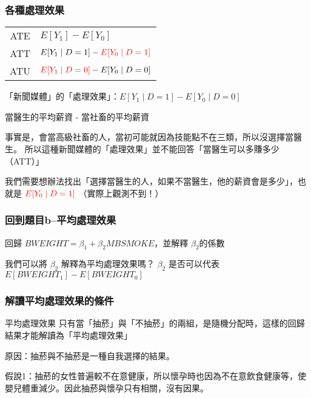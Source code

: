 \begin{frame}
    \frametitle{各種處理效果}
    \begin{table}
        \centering
        \begin{tabular}{c | l}
            \hline
            ATE & $E[Y_1] - E[Y_0]$ \\
            ATT & $E[Y_1 \mid D=1] - \begingroup \color{red} E[Y_0 \mid D=1]\endgroup$ \\
            ATU & $\begingroup \color{red}E[Y_1 \mid D=0] \endgroup -  E[Y_0 \mid D=0]$ \\
            \hline
        \end{tabular}
    \end{table}
    \vfill
    「新聞媒體」的「處理效果」：$E[Y_1 \mid D=1] - E[Y_0 \mid D=0]$
    
    當醫生的平均薪資 - 當社畜的平均薪資

    事實是，會當高級社畜的人，當初可能就因為技能點不在三類，所以沒選擇當醫生。
    所以這種新聞媒體的「處理效果」並不能回答「當醫生可以多賺多少（ATT）」
    
    我們需要想辦法找出「選擇當醫生的人，如果不當醫生，他的薪資會是多少」，也就是
    $\begingroup \color{red} E[Y_0 \mid D=1]\endgroup$ （實際上觀測不到！）
\end{frame}

\begin{frame}
    \frametitle{回到題目b--平均處理效果}

    回歸 $BWEIGHT = \beta_1 + \beta_2 MBSMOKE$，並解釋 $\beta_2$的係數

    \begin{alertblock}{我們可以將 $\beta_2$ 解釋為平均處理效果嗎？}
        $\beta_2$ 是否可以代表 $E[BWEIGHT_1] - E[BWEIGHT_0]$
    \end{alertblock}
\end{frame}

\begin{frame}
    \frametitle{解讀平均處理效果的條件}

    \begin{block}{平均處理效果}
        只有當「抽菸」與「不抽菸」的兩組，是隨機分配時，這樣的回歸結果才能解讀為「平均處理效果」
    \end{block}

    原因：抽菸與不抽菸是一種自我選擇的結果。

    假說1：抽菸的女性普遍較不在意健康，所以懷孕時也因為不在意飲食健康等，使嬰兒體重減少。因此抽菸與懷孕只有相關，沒有因果。
\end{frame}

